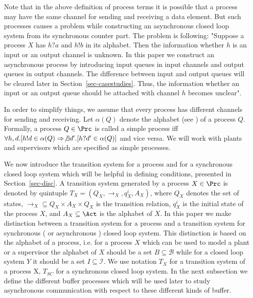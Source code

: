 \documentclass[a4paper,english,final]{article}
\theoremstyle{plain}
\theoremstyle{definition}
\newcommand{\hide}{\ensuremath{\mathcal{I}}}
\newcommand{\block}{\ensuremath{\mathcal{B}}}
\begin{document}
Note that in the above definition of process terms it is possible that a process may have the same channel for sending and receiving a data element. But such processes causes a problem while constructing an asynchronous closed loop system from its synchronous counter part. The problem is following: "Suppose a process $X$ has $h?a$ and $h!b$ in its alphabet. Then the information whether $h$ is an input or an output channel is unknown. In this paper we construct an asynchronous process by introducing input queues in input channels and output queues in output channels. The difference between input and output queues will be cleared later in Section~\ref{sec-casestudies}. Thus, the information whether an input or an output queue should be attached with channel $h$ becomes unclear".

In order to simplify things, we assume that every process has different channels for sending and receiving. Let $\alpha(Q)$ denote the alphabet (see \citep{acpbook}) of a process $Q$. Formally, a process $Q\in\Prc$ is called a simple process iff $\forall h,d.[ h!d\in\alpha(Q)\Rightarrow \not\exists d'.[h?d'\in\alpha(Q)]$ and vice versa. We will work with plants and supervisors which are specified as simple processes. 

We now introduce the transition system for a process and for a synchronous closed loop system which will be helpful in defining conditions, presented in Section~\ref{sec-disc}. A transition system generated by a process $X\in\Prc$ is denoted by quintuple $T_X=(Q_X,\rightarrow_X,q^i_X,A_X)$, where $Q_X$ denotes the set of states, $\rightarrow_X\subseteq Q_X\times A_X\times Q_X$ is the transition relation, $q^i_X$ is the initial state of the process $X$, and $A_X\subseteq\Act$ is the alphabet of $X$. In this paper we make distinction between a transition system for a process and a transition system for synchronous ( or asynchronous ) closed loop system. This distinction is based on the alphabet of a process, i.e. for a process $X$ which can be used to model a plant or a supervisor the alphabet of $X$ should be a set $B\subseteq\block$ while for a closed loop system $Y$ it should be a set $I\subseteq\hide$. We use notation $T_X$ for a transition system of a process X, $T_{SC}$ for a synchronous closed loop system. In the next subsection we define the different buffer processes which will be used later to study asynchronous communication with respect to these different kinds of buffer.
\end{document}
